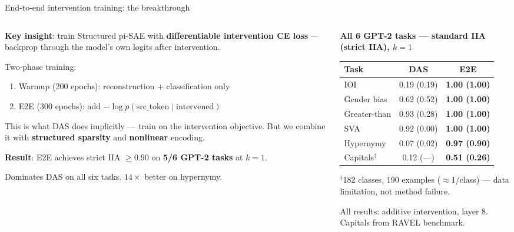 \documentclass[aspectratio=169,11pt]{beamer}
\begin{document}
\begin{frame}{End-to-end intervention training: the breakthrough}

\begin{columns}[T]
\begin{column}{0.48\textwidth}
{\small \textbf{Key insight}: train Structured pi-SAE with \textbf{differentiable intervention CE loss} --- backprop through the model's own logits after intervention.}

\vspace{0.3em}
{\small Two-phase training:}
\begin{enumerate}
  \item {\small Warmup (200 epochs): reconstruction + classification only}
  \item {\small E2E (300 epochs): add $-\log p(\text{src\_token} \mid \text{intervened})$}
\end{enumerate}

\vspace{0.3em}
{\small This is what DAS does implicitly --- train on the intervention objective. But we combine it with \textbf{structured sparsity} and \textbf{nonlinear} encoding.}

\vspace{0.5em}
{\small \textbf{Result}: E2E achieves strict IIA $\geq 0.90$ on \textbf{5/6 GPT-2 tasks} at $k{=}1$.}

\vspace{0.3em}
{\small Dominates DAS on all six tasks. $14\times$ better on hypernymy.}
\end{column}
\begin{column}{0.50\textwidth}
{\scriptsize\centering
\renewcommand{\arraystretch}{1.15}
\textbf{All 6 GPT-2 tasks --- standard IIA (strict IIA), $k{=}1$}\\[0.3em]
\begin{tabular}{l|cc}
\toprule
\textbf{Task} & \textbf{DAS} & \textbf{E2E} \\
\midrule
IOI          & 0.19 (0.19) & \textbf{1.00 (1.00)} \\
Gender bias  & 0.62 (0.52) & \textbf{1.00 (1.00)} \\
Greater-than & 0.93 (0.28) & \textbf{1.00 (1.00)} \\
SVA          & 0.92 (0.00) & \textbf{1.00 (1.00)} \\
Hypernymy    & 0.07 (0.02) & \textbf{0.97 (0.90)} \\
Capitals$^\dagger$ & 0.12 (---) & \textbf{0.51 (0.26)} \\
\bottomrule
\end{tabular}
}

\vspace{0.3em}
{\scriptsize $^\dagger$182 classes, 190 examples ($\approx$1/class) --- data limitation, not method failure.}

\vspace{0.3em}
{\scriptsize All results: additive intervention, layer 8. Capitals from RAVEL benchmark.}
\end{column}
\end{columns}
\end{frame}
\end{document}

